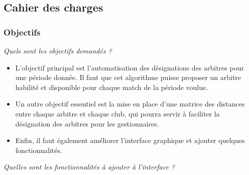 \subsection{Cahier des charges}

\subsubsection{Objectifs}
\textit{Quels sont les objectifs demandés ?}\\

\begin{itemize}
    \item L’objectif principal est l’automatisation des désignations des arbitres pour une période donnée. Il faut que cet algorithme puisse proposer un arbitre habilité et disponible pour chaque match de la période voulue.
    \item Un autre objectif essentiel est la mise en place d’une matrice des distances entre chaque arbitre et chaque club, qui pourra servir à faciliter la désignation des arbitres pour les gestionnaires.
    \item Enfin, il faut également améliorer l’interface graphique et ajouter quelques fonctionnalités.
\end{itemize}

\vspace{1cm}

\textit{Quelles sont les fonctionnalités à ajouter à l’interface ?}\\

